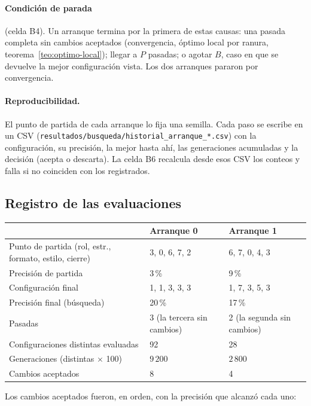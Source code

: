 \paragraph{Condición de parada} (celda B4). Un arranque termina por la primera de estas
causas: una pasada completa sin cambios aceptados (convergencia, óptimo local por ranura,
teorema~\ref{teo:optimo-local}); llegar a $P$ pasadas; o agotar $B$, caso en que se
devuelve la mejor configuración vista. Los dos arranques pararon por convergencia.

\paragraph{Reproducibilidad.} El punto de partida de cada arranque lo fija una semilla.
Cada paso se escribe en un CSV (\texttt{resultados/busqueda/historial\_arranque\_*.csv}) con
la configuración, su precisión, la mejor hasta ahí, las generaciones acumuladas y la
decisión (acepta o descarta). La celda B6 recalcula desde esos CSV los conteos y falla si no
coinciden con los registrados.

\subsection{Registro de las evaluaciones}

\begin{center}
\begin{tabular}{p{}p{}p{}}
\toprule
 & Arranque 0 & Arranque 1 \\
\midrule
Punto de partida (rol, estr., formato, estilo, cierre) & 3, 0, 6, 7, 2 & 6, 7, 0, 4, 3 \\
Precisión de partida & 3\,\% & 9\,\% \\
Configuración final & 1, 1, 3, 3, 3 & 1, 7, 3, 5, 3 \\
Precisión final (búsqueda) & 20\,\% & 17\,\% \\
Pasadas & 3 (la tercera sin cambios) & 2 (la segunda sin cambios) \\
Configuraciones distintas evaluadas & 92 & 28 \\
Generaciones (distintas $\times$ 100) & $9\,200$ & $2\,800$ \\
Cambios aceptados & 8 & 4 \\
\bottomrule
\end{tabular}
\end{center}

Los cambios aceptados fueron, en orden, con la precisión que alcanzó cada uno:

